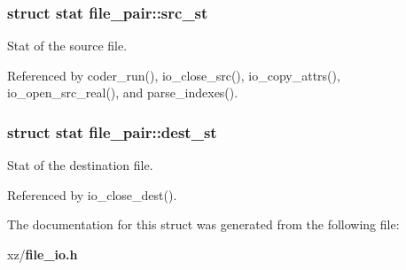 \subsubsection[{src\-\_\-st}]{\setlength{\rightskip}{0pt plus 5cm}struct stat file\-\_\-pair\-::src\-\_\-st}\label{structfile__pair_ab2b63e4c15c0489b67ee3d795174d3dc}


Stat of the source file. 



Referenced by coder\-\_\-run(), io\-\_\-close\-\_\-src(), io\-\_\-copy\-\_\-attrs(), io\-\_\-open\-\_\-src\-\_\-real(), and parse\-\_\-indexes().

\subsubsection[{dest\-\_\-st}]{\setlength{\rightskip}{0pt plus 5cm}struct stat file\-\_\-pair\-::dest\-\_\-st}\label{structfile__pair_a31c3f2a5ea5d9538c4e29398c535a183}


Stat of the destination file. 



Referenced by io\-\_\-close\-\_\-dest().



The documentation for this struct was generated from the following file\-:\begin{DoxyCompactItemize}
\item 
xz/{\bf file\-\_\-io.\-h}\end{DoxyCompactItemize}
